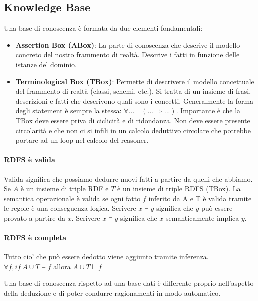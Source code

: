 \subsection{Knowledge Base}
Una base di conoscenza è formata da due elementi fondamentali:
\begin{itemize}
	\item \textbf{Assertion Box (ABox)}: La parte di conoscenza che descrive il modello concreto del nostro frammento di realtà. Descrive i fatti in funzione delle istanze del dominio.
	\item \textbf{Terminological Box (TBox)}: Permette di descrivere il modello concettuale del frammento di realtà (classi, schemi, etc.). Si tratta di un insieme di frasi, descrizioni e fatti che descrivono quali sono i concetti. Generalmente la forma degli statement è sempre la stessa: $\forall...\quad(...\Rightarrow...)$. Importante è che la TBox deve essere priva di ciclicità e di ridondanza. Non deve essere presente circolarità e che non ci si infili in un  calcolo deduttivo circolare che potrebbe portare ad un loop nel calcolo del reasoner.
\end{itemize}
\paragraph{RDFS è  valida}
Valida significa che possiamo dedurre nuovi fatti a partire da quelli che abbiamo. Se $A$ è un insieme di triple RDF e $T$ è un insieme di triple RDFS (TBox). La semantica operazionale è valida se ogni fatto $f$ inferito da A e T è valida tramite le regole è una conseguenza logica.
Scrivere $x \vdash y$ significa che $y$ può essere provato a partire da $x$. Scrivere  $x\models y$ significa che $x$ semanticamente implica $y$.

\paragraph{RDFS è completa}
Tutto cio' che può essere dedotto viene aggiunto tramite inferenza.
$\forall f, if\ A \cup T \models f$ allora $A \cup T \vdash f$

\noindent Una base di conoscenza rispetto ad una base dati è differente proprio nell'aspetto della deduzione e di poter condurre ragionamenti in modo automatico.